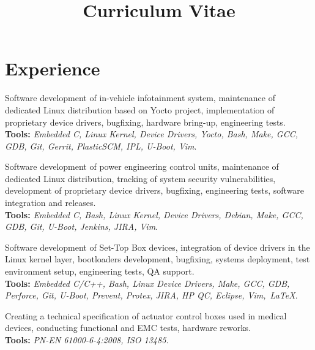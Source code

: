 \documentclass[11pt,a4paper,sans]{moderncv} %
\title{Curriculum Vitae}
\begin{document}
\makecvtitle %


\section{Experience}

{Software development of in-vehicle infotainment system, maintenance of dedicated Linux distribution based on Yocto project, implementation of proprietary device drivers, bugfixing, hardware bring-up, engineering tests.\\ \textbf{Tools:} \textit{Embedded C, Linux Kernel, Device Drivers, Yocto, Bash, Make, GCC, GDB, Git, Gerrit, PlasticSCM, IPL, U-Boot, Vim}.}


{Software development of power engineering control units, maintenance of dedicated Linux distribution, tracking of system security vulnerabilities, development of proprietary device drivers, bugfixing, engineering tests, software integration and releases. \\ \textbf{Tools:} \textit{Embedded C, Bash, Linux Kernel, Device Drivers, Debian, Make, GCC, GDB, Git, U-Boot, Jenkins, JIRA, Vim}.}


{Software development of Set-Top Box devices, integration of device drivers in the Linux kernel layer, bootloaders development, bugfixing, systems deployment, test environment setup, engineering tests, QA support. \\ \textbf{Tools:} \textit{Embedded C/C++, Bash, Linux Device Drivers, Make, GCC, GDB, Perforce, Git, U-Boot, Prevent, Protex, JIRA, HP QC, Eclipse, Vim,~\LaTeX}.}

{Creating a technical specification of actuator control boxes used in medical devices, conducting functional and EMC tests, hardware reworks. \\ \textbf{Tools:} \textit{PN-EN 61000-6-4:2008, ISO 13485.}}
\end{document}
